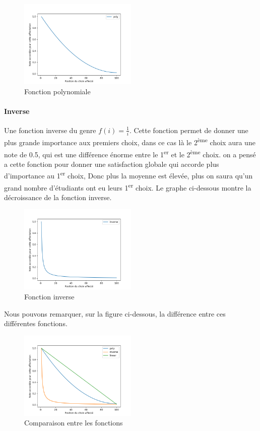 \documentclass[12pt,titlepage]{article}
\begin{document}
\begin{figure}[!h]
  \centering
  \includegraphics[width = 0.5\textwidth]{img/poly.png}
  \caption{Fonction polynomiale}
\end{figure}

\paragraph{Inverse} Une fonction inverse du genre $f(i) = \frac{1}{i}$. Cette fonction permet de donner une plus grande importance aux premiers choix, dans ce cas là le 2\textsuperscript{ème} choix aura une note de 0.5, qui est une différence énorme entre le 1\textsuperscript{er} et le 2\textsuperscript{ème} choix. on a pensé a cette fonction pour donner une satisfaction globale qui accorde plus d'importance au 1\textsuperscript{er} choix, Donc plus la moyenne est élevée, plus on saura qu'un grand nombre d'étudiants ont eu leurs 1\textsuperscript{er} choix. Le graphe ci-dessous montre la décroissance de la fonction inverse. 

\begin{figure}[!h]
  \centering
  \includegraphics[width = 0.5\textwidth]{img/inverse.png}
  \caption{Fonction inverse}
\end{figure}

Nous pouvons remarquer, sur la figure ci-dessous, la différence entre ces différentes fonctions.

\begin{figure}[!h]
  \centering
  \includegraphics[width = 0.5\textwidth]{img/comparatif.png}
  \caption{Comparaison entre les fonctions}
\end{figure}
\end{document}
